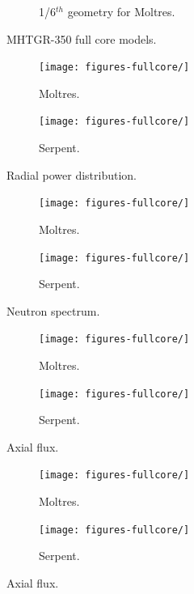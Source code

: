 \documentclass[11pt,letterpaper]{article}
\begin{document}
\begin{figure}[htbp!]
\begin{subfigure}[t]{0.4\textwidth}
		\caption{1/6$^{th}$ geometry for Moltres.}
	\end{subfigure}
	\hfill
	\caption{MHTGR-350 full core models.}
	\label{fig:fullcoremodel}
\end{figure}

\begin{figure}[htbp!]
	\centering
	\begin{subfigure}[t]{0.4\textwidth}
		\centering
		\texttt{[image: figures-fullcore/]}
		\caption{Moltres.}
	\end{subfigure}
	\begin{subfigure}[t]{0.4\textwidth}
		\centering
		\texttt{[image: figures-fullcore/]}
		\caption{Serpent.}
	\end{subfigure}
	\hfill
	\caption{Radial power distribution.}
	\label{fig:fullcore-power}
\end{figure}

\begin{figure}[htbp!]
	\centering
	\begin{subfigure}[t]{0.4\textwidth}
		\centering
		\texttt{[image: figures-fullcore/]}
		\caption{Moltres.}
	\end{subfigure}
	\begin{subfigure}[t]{0.4\textwidth}
		\centering
		\texttt{[image: figures-fullcore/]}
		\caption{Serpent.}
	\end{subfigure}
	\hfill
	\caption{Neutron spectrum.}
	\label{fig:fullcore-spectrum}
\end{figure}

\begin{figure}[htbp!]
	\centering
	\begin{subfigure}[t]{0.4\textwidth}
		\centering
		\texttt{[image: figures-fullcore/]}
		\caption{Moltres.}
	\end{subfigure}
	\begin{subfigure}[t]{0.4\textwidth}
		\centering
		\texttt{[image: figures-fullcore/]}
		\caption{Serpent.}
	\end{subfigure}
	\hfill
	\caption{Axial flux.}
	\label{fig:fullcore-axial1}
\end{figure}

\begin{figure}[htbp!]
	\centering
	\begin{subfigure}[t]{0.4\textwidth}
		\centering
		\texttt{[image: figures-fullcore/]}
		\caption{Moltres.}
	\end{subfigure}
	\begin{subfigure}[t]{0.4\textwidth}
		\centering
		\texttt{[image: figures-fullcore/]}
		\caption{Serpent.}
	\end{subfigure}
	\hfill
	\caption{Axial flux.}
	\label{fig:fullcore-axial2}
\end{figure}
\end{document}
